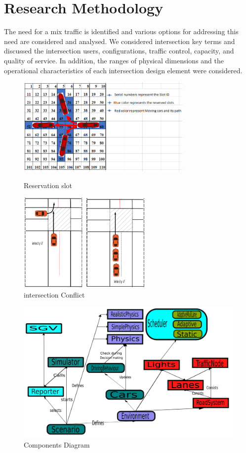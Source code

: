 \documentclass{book}
\begin{document}
\section{Research Methodology}
\label{sec:methodology}
The	need	for	 a mix traffic is	identified	and	various	options	for	addressing this	need	are	considered	and	analysed.	We considered intersection	key	terms	and	discussed the intersection	users,	configurations,	traffic	control,	capacity,	and	quality	of	service.
In addition, the	ranges	of	physical	dimensions	and	the	operational	characteristics	of	each	intersection	design	element were considered.


\begin{figure}
\centering
\includegraphics[width=8.5cm]{tiles}
\label{considerations}
\caption{Reservation slot}
\label{fig:tilesslot}
\end{figure}

\begin{figure}
\centering
\includegraphics[width=6.5cm]{conflicscenerio}
\caption{intersection Conflict}
\label{fig:intersectionConflict}
\end{figure}

\begin{figure}
\centering
\includegraphics[width=15cm]{Componentsodg}
\caption{Components Diagram}
\label{fig:componentsdiagram}
\end{figure}
\end{document}
